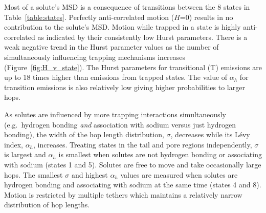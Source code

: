 \documentclass[aps,pre,preprint,groupedaddress,longbibliography]{revtex4-2}
\begin{document}
  Most of a solute's MSD is a consequence of transitions between the 8 states
  in Table~\ref{table:states}. Perfectly anti-correlated motion ($H$=0) results in
  no contribution to the solute's MSD. Motion while trapped in a state is highly 
  anti-correlated as indicated by their consistently low Hurst parameters.
  There is a weak negative trend in the Hurst parameter values as the number
  of simultaneously influencing trapping mechanisms increases (Figure~\ref{fig:H_v_state}). 
  The Hurst parameters for transitional (T) emissions are up to 18 times higher than
  emissions from trapped states. The value of $\alpha_h$ for 
  transition emissions is also relatively low giving higher probabilities to larger hops.
  
  As solutes are influenced by more trapping interactions simultaneously (e.g.~hydrogen
  bonding \textit{and} association with sodium versus just hydrogen bonding), the 
  width of the hop length distribution, $\sigma$, decreases while its L\'evy index,
  $\alpha_h$, increases. Treating states in the tail and pore regions independently, 
  $\sigma$ is largest and $\alpha_h$ is smallest when solutes are not hydrogen bonding
  or associating with sodium (states 1 and 5). Solutes are free to move and take 
  occasionally large hops. The smallest $\sigma$ and highest $\alpha_h$ values are
  measured when solutes are hydrogen bonding and associating with sodium at the
  same time (states 4 and 8). Motion is restricted by 
  multiple tethers which 
  maintains a relatively narrow distribution of hop lengths.
  
\end{document}
